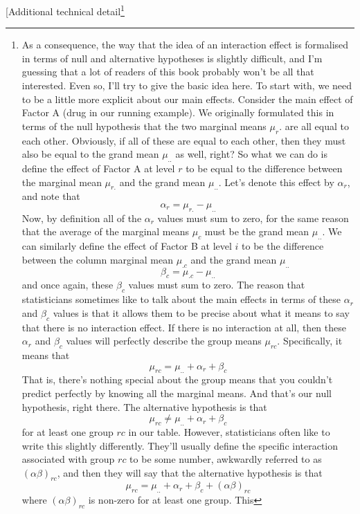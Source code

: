 \documentclass[
  a4paper,
]{book}
\begin{document}
{[}Additional technical detail\footnote{As a consequence, the way that
  the idea of an interaction effect is formalised in terms of null and
  alternative hypotheses is slightly difficult, and I'm guessing that a
  lot of readers of this book probably won't be all that interested.
  Even so, I'll try to give the basic idea here. To start with, we need
  to be a little more explicit about our main effects. Consider the main
  effect of Factor A (drug in our running example). We originally
  formulated this in terms of the null hypothesis that the two marginal
  means \(\mu_r\). are all equal to each other. Obviously, if all of
  these are equal to each other, then they must also be equal to the
  grand mean \(\mu_{..}\) as well, right? So what we can do is define
  the effect of Factor A at level \(r\) to be equal to the difference
  between the marginal mean \(\mu_{r.}\) and the grand mean
  \(\mu_{..}\). Let's denote this effect by \(\alpha_r\), and note that
  \[\alpha_r=\mu_{r.}-\mu_{..}\] Now, by definition all of the
  \(\alpha_r\) values must sum to zero, for the same reason that the
  average of the marginal means \(\mu_c\) must be the grand mean
  \(\mu_{..}\). We can similarly define the effect of Factor B at level
  \(i\) to be the difference between the column marginal mean
  \(\mu_{.c}\) and the grand mean \(\mu_{..}\)
  \[\beta_c=\mu_{.c}-\mu_{..}\] and once again, these \(\beta_c\) values
  must sum to zero. The reason that statisticians sometimes like to talk
  about the main effects in terms of these \(\alpha_r\) and \(\beta_c\)
  values is that it allows them to be precise about what it means to say
  that there is no interaction effect. If there is no interaction at
  all, then these \(\alpha_r\) and \(\beta_c\) values will perfectly
  describe the group means \(\mu_{rc}\). Specifically, it means that
  \[\mu_{rc}=\mu_{..}+\alpha_{r}+\beta_{c}\] That is, there's nothing
  special about the group means that you couldn't predict perfectly by
  knowing all the marginal means. And that's our null hypothesis, right
  there. The alternative hypothesis is that
  \[\mu_{rc} \neq \mu_{..}+\alpha_{r}+\beta_{c}\] for at least one group
  \(rc\) in our table. However, statisticians often like to write this
  slightly differently. They'll usually define the specific interaction
  associated with group \(rc\) to be some number, awkwardly referred to
  as \((\alpha \beta)_{rc}\), and then they will say that the
  alternative hypothesis is that
  \[\mu_{rc}=\mu_{..} +\alpha_{r} +\beta_{c} + (\alpha \beta )_{rc}\]
  where \((\alpha \beta)_{rc}\) is non-zero for at least one group. This
}
\end{document}
